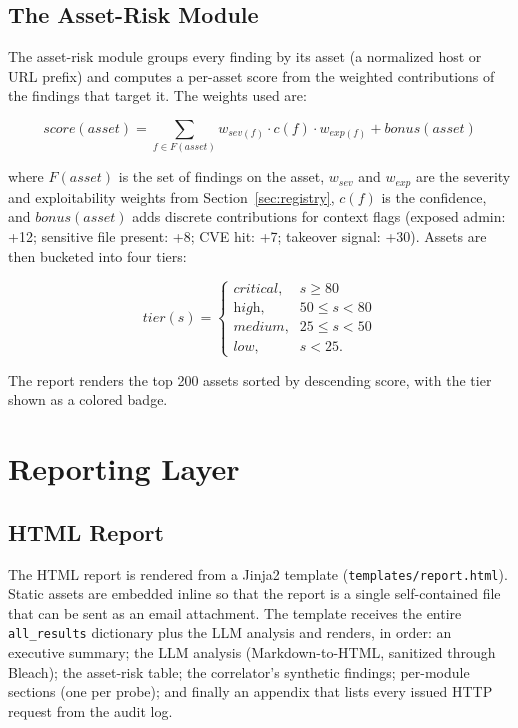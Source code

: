 \subsection{The Asset-Risk Module}

The asset-risk module groups every finding by its asset (a normalized host or URL prefix) and computes a per-asset score from the weighted contributions of the findings that target it. The weights used are:

\[
\textit{score}(asset) = \sum_{f \in F(asset)} w_{\textit{sev}(f)} \cdot c(f) \cdot w_{\textit{exp}(f)} + \textit{bonus}(asset)
\]

where $F(asset)$ is the set of findings on the asset, $w_{\textit{sev}}$ and $w_{\textit{exp}}$ are the severity and exploitability weights from Section~\ref{sec:registry}, $c(f)$ is the confidence, and $\textit{bonus}(asset)$ adds discrete contributions for context flags (exposed admin: +12; sensitive file present: +8; CVE hit: +7; takeover signal: +30). Assets are then bucketed into four tiers:

\[
\textit{tier}(s) =
\begin{cases}
\textit{critical}, & s \ge 80 \\
\textit{high},     & 50 \le s < 80 \\
\textit{medium},   & 25 \le s < 50 \\
\textit{low},      & s < 25.
\end{cases}
\]

The report renders the top 200 assets sorted by descending score, with the tier shown as a colored badge.

\section{Reporting Layer}

\subsection{HTML Report}

The HTML report is rendered from a Jinja2 template (\texttt{templates/report.html}). Static assets are embedded inline so that the report is a single self-contained file that can be sent as an email attachment. The template receives the entire \texttt{all\_results} dictionary plus the LLM analysis and renders, in order: an executive summary; the LLM analysis (Markdown-to-HTML, sanitized through Bleach); the asset-risk table; the correlator's synthetic findings; per-module sections (one per probe); and finally an appendix that lists every issued HTTP request from the audit log.

